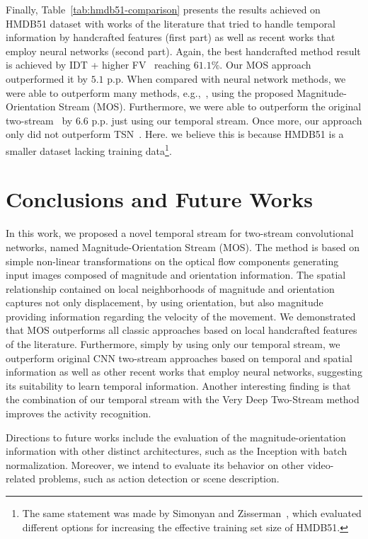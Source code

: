 \documentclass[10pt,conference]{IEEEtran}
\begin{document}
Finally, Table~\ref{tab:hmdb51-comparison} presents the results achieved on HMDB51 dataset with works of the literature that tried to handle temporal information by handcrafted features (first part) as well as recent works that employ neural networks (second part). Again, the best handcrafted method result is achieved by IDT + higher FV~\cite{Peng:2016} reaching $61.1\%$. Our MOS approach outperformed it by $5.1$ p.p. When compared with neural network methods, we were able to outperform many methods, e.g.,~\cite{Karpathy:2014, Srivastava:2015, Tran:2015, Sun:2015, Simonyan:2014, Zhu:2016}, using the proposed Magnitude-Orientation Stream (MOS). Furthermore, we were able to outperform the original two-stream~\cite{Simonyan:2014} by $6.6$ p.p. just using our temporal stream. Once more, our approach only did not outperform TSN~\cite{Wang:2016}. Here. we believe this is because HMDB51 is a smaller dataset lacking training data\footnote{The same statement was made by Simonyan and Zisserman~\cite{Simonyan:2014}, which evaluated different options for increasing the effective training set size of HMDB51.}.

\section{Conclusions and Future Works}\label{conclusions}

In this work, we proposed a novel temporal stream for two-stream convolutional networks, named Magnitude-Orientation Stream (MOS). The method is based on simple non-linear transformations on the optical flow components generating input images composed of magnitude and orientation information. The spatial relationship contained on local neighborhoods of magnitude and orientation captures not only displacement, by using orientation, but also magnitude providing information regarding the velocity of the movement. We demonstrated that MOS outperforms all classic approaches based on local handcrafted features of the literature. Furthermore, simply by using only our temporal stream, we outperform original CNN two-stream approaches based on temporal and spatial information as well as other recent works that employ neural networks, suggesting its suitability to learn temporal information. Another interesting finding is that the combination of our temporal stream with the Very Deep Two-Stream method improves the activity recognition.

Directions to future works include the evaluation of the magnitude-orientation information with other distinct architectures, such as the Inception with batch normalization. Moreover, we intend to evaluate its behavior on other video-related problems, such as action detection or scene description.
\end{document}

